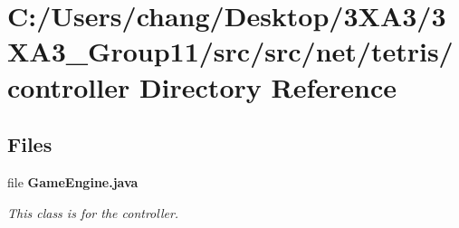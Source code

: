 \section{C\+:/\+Users/chang/\+Desktop/3\+X\+A3/3\+X\+A3\+\_\+\+Group11/src/src/net/tetris/controller Directory Reference}
\label{dir_a654d5acbbbda5b976db0264b22a3e34}
\subsection*{Files}
\begin{DoxyCompactItemize}
\item 
file {\bf Game\+Engine.\+java}
\begin{DoxyCompactList}\small\item\em This class is for the controller. \end{DoxyCompactList}\end{DoxyCompactItemize}
